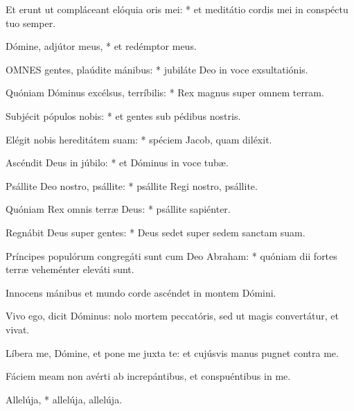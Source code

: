 Et erunt ut compláceant elóquia oris mei: * et meditátio cordis mei in conspéctu tuo semper.

Dómine, adjútor meus, * et redémptor meus.



\lettrine[lines=2]{O}{MNES} gentes, plaúdite mánibus: * jubiláte Deo in voce exsultatiónis.

Quóniam Dóminus excélsus, terríbilis: * Rex magnus super omnem terram.

Subjécit pópulos nobis: * et gentes sub pédibus nostris.

Elégit nobis hereditátem suam: * spéciem Jacob, quam diléxit.

Ascéndit Deus in júbilo: * et Dóminus in voce tubæ.

Psállite Deo nostro, psállite: * psállite Regi nostro, psállite.

Quóniam Rex omnis terræ Deus: * psállite sapiénter.

Regnábit Deus super gentes: * Deus sedet super sedem sanctam suam.

Príncipes populórum congregáti sunt cum Deo Abraham: * quóniam dii fortes terræ veheménter eleváti sunt.


  Innocens mánibus et mundo corde ascéndet in montem Dómini.



 Vivo ego, dicit Dóminus: nolo mortem peccatóris, sed ut magis convertátur, et vivat.


 Líbera me, Dómine, et pone me juxta te: et cujúsvis manus pugnet contra me.


 Fáciem meam non avérti ab increpántibus, et conspuéntibus in me.

  Allelúja, * allelúja, allelúja.


